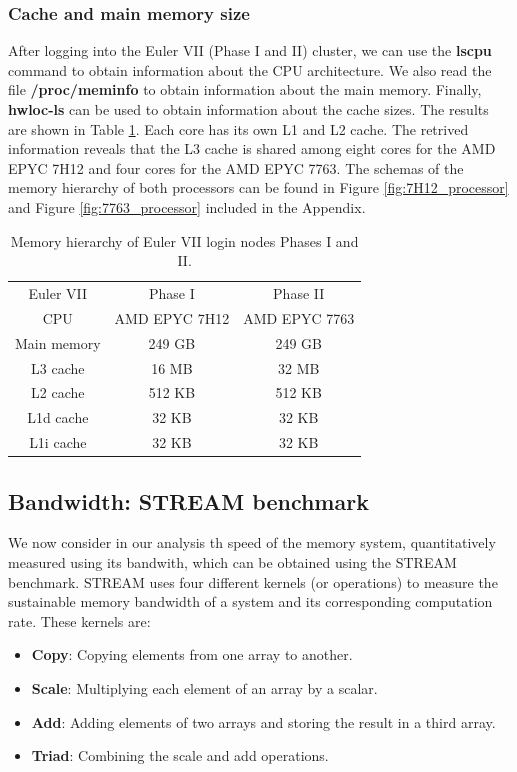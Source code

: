 \documentclass[unicode,11pt,a4paper,oneside,numbers=endperiod,openany]{scrartcl}
\begin{document}
\subsubsection{Cache and main memory size}
After logging into the Euler VII (Phase I and II) cluster, we can use the \textbf{lscpu} command to obtain information
about the CPU architecture. We also read the file \textbf{/proc/meminfo} to obtain information about the main memory.
Finally, \textbf{hwloc-ls} can be used to obtain information about the cache sizes. The results are shown in Table \ref{tab:memory_config}.
Each core has its own L1 and L2 cache. The retrived information reveals that the L3 cache is shared among eight 
cores for the AMD EPYC 7H12 and four cores for the AMD EPYC 7763. 
The schemas of the memory hierarchy of both processors can be found in 
Figure \ref{fig:7H12_processor} and Figure \ref{fig:7763_processor} included in the Appendix.


\begin{table}[h]
    \centering
    \caption{Memory hierarchy of Euler VII login nodes Phases I and II.}
    \begin{tabular}{||c c c||} 
     \hline
    Euler VII & Phase I & Phase II \\ [0.5ex] 
    CPU & AMD EPYC 7H12 & AMD EPYC 7763 \\
    \hline\hline
     Main memory & 249 GB & 249 GB \\ 
     \hline
     L3 cache & 16 MB & 32 MB \\
     \hline
     L2 cache & 512 KB & 512 KB \\
     \hline
     L1d cache & 32 KB & 32 KB \\
     \hline
     L1i cache & 32 KB & 32 KB \\
     \hline
    \end{tabular}
    \label{tab:memory_config}
\end{table}


\subsection{Bandwidth: STREAM benchmark}\label{sec:STREAM_benchmark}
We now consider in our analysis th speed of the memory system, quantitatively measured using its 
bandwith, which can be obtained using the STREAM benchmark. STREAM uses four different kernels (or 
operations) to measure the sustainable memory bandwidth of a system and its corresponding
computation rate. These kernels are:
\begin{itemize}
    \item \textbf{Copy}: Copying elements from one array to another.
    \item \textbf{Scale}: Multiplying each element of an array by a scalar.
    \item \textbf{Add}: Adding elements of two arrays and storing the result in a third array.
    \item \textbf{Triad}: Combining the scale and add operations.
\end{itemize}
\end{document}
